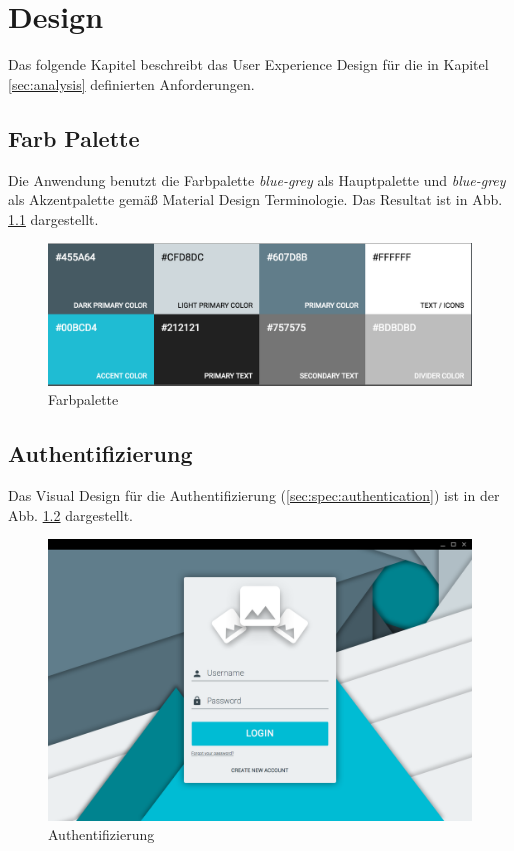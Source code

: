 \chapter{Design}

Das folgende Kapitel beschreibt das User Experience Design für die in Kapitel \ref{sec:analysis} definierten Anforderungen.

\section{Farb Palette}

Die Anwendung benutzt die Farbpalette \emph{blue-grey} als Hauptpalette und \emph{blue-grey} als Akzentpalette gemäß Material Design Terminologie. Das Resultat ist in Abb. \ref{fig:color_palette} dargestellt.

\begin{figure}[htp]     %
\centering
\includegraphics[width=1.0\textwidth]{images/color_palette}
\caption{Farbpalette}\label{fig:color_palette}
\end{figure}

\section{Authentifizierung}

Das Visual Design für die Authentifizierung (\ref{sec:spec:authentication}) ist in der Abb. \ref{fig:login_form} dargestellt.

\begin{figure}[htp]     %
\centering
\includegraphics[width=1.0\textwidth]{images/login_form}
\caption{Authentifizierung}\label{fig:login_form}
\end{figure}

